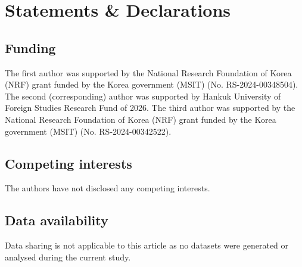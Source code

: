 \documentclass[reqno,11pt]{article}
\theoremstyle{plain} %
\theoremstyle{definition} %
\begin{document}
\section*{Statements \& Declarations}

\subsection*{Funding}
The first author was supported
by the National Research Foundation of Korea (NRF) grant funded by the Korea government (MSIT)
(No. RS-2024-00348504).
The second (corresponding) author was supported
by Hankuk University of Foreign Studies Research Fund of 2026.
The third author was supported
by the National Research Foundation of Korea (NRF) grant funded by the Korea government (MSIT)
(No. RS-2024-00342522).

\subsection*{Competing interests}
The authors have not disclosed any competing interests.

\subsection*{Data availability}
Data sharing is not applicable to this article as no datasets
were generated or analysed during the current study.
\end{document}
